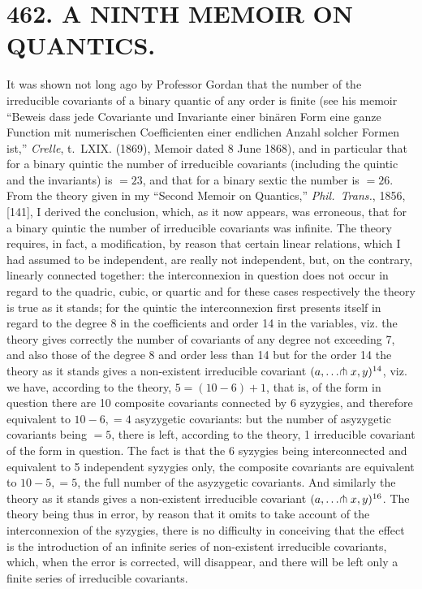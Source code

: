 \documentclass[11pt,a4paper]{article}
\newcommand{\article}[2]{\section*{#1. #2}}
\begin{document}
\newpage
\setcounter{page}{334}

\article{462}{A NINTH MEMOIR ON QUANTICS.}


\vspace{0.5em}

It was shown not long ago by Professor Gordan that the number of the irreducible covariants of a binary quantic of any order is finite (see his memoir ``Beweis dass jede Covariante und Invariante einer bin\"{a}ren Form eine ganze Function mit numerischen Coefficienten einer endlichen Anzahl solcher Formen ist,'' \textit{Crelle}, t.~LXIX. (1869), Memoir dated 8 June 1868), and in particular that for a binary quintic the number of irreducible covariants (including the quintic and the invariants) is $=23$, and that for a binary sextic the number is $=26$. From the theory given in my ``Second Memoir on Quantics,'' \textit{Phil.\ Trans.}, 1856, [141], I derived the conclusion, which, as it now appears, was erroneous, that for a binary quintic the number of irreducible covariants was infinite. The theory requires, in fact, a modification, by reason that certain linear relations, which I had assumed to be independent, are really not independent, but, on the contrary, linearly connected together: the interconnexion in question does not occur in regard to the quadric, cubic, or quartic and for these cases respectively the theory is true as it stands; for the quintic the interconnexion first presents itself in regard to the degree 8 in the coefficients and order 14 in the variables, viz. the theory gives correctly the number of covariants of any degree not exceeding 7, and also those of the degree 8 and order less than 14 but for the order 14 the theory as it stands gives a non-existent irreducible covariant $(a, \ldots \hspace{-0.2em}\pitchfork x, y)^{14}$, viz. we have, according to the theory, $5 = (10 - 6) + 1$, that is, of the form in question there are 10 composite covariants connected by 6 syzygies, and therefore equivalent to $10 - 6, = 4$ asyzygetic covariants: but the number of asyzygetic covariants being $= 5$, there is left, according to the theory, 1 irreducible covariant of the form in question. The fact is that the 6 syzygies being interconnected and equivalent to 5 independent syzygies only, the composite covariants are equivalent to $10 - 5, = 5$, the full number of the asyzygetic covariants. And similarly the theory as it stands gives a non-existent irreducible covariant $(a, \ldots \hspace{-0.2em}\pitchfork x, y)^{16}$. The theory being thus in error, by reason that it omits to take account of the interconnexion of the syzygies, there is no difficulty in conceiving that the effect is the introduction of an infinite series of non-existent irreducible covariants, which, when the error is corrected, will disappear, and there will be left only a finite series of irreducible covariants.
\end{document}
